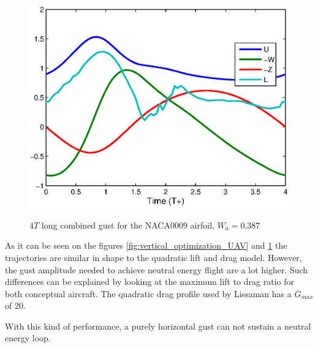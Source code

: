 \begin{figure}[h]
  \begin{center}
    \scalebox{1.0}
    {\includegraphics{./Figures/Windtype=3_Tg=4_Wg=0p387_UAV_alphamax=12.eps}}
  \end{center}
  \caption{$4T$ long combined gust for the NACA0009 airfoil, $W_a=0.387$}
  \label{fig:combined_optimization_UAV}
\end{figure}

\FloatBarrier

As it can be seen on the figures \ref{fig:vertical_optimization_UAV} and \ref{fig:combined_optimization_UAV} the trajectories are similar in shape to the quadratic lift and drag model.
However, the gust amplitude needed to achieve neutral energy flight are a lot higher.
Such differences can be explained by looking at the maximum lift to drag ratio for both conceptual aircraft.
The quadratic drag profile used by Lissaman has a $G_{max}$ of 20.

\FloatBarrier

\par With this kind of performance, a purely horizontal gust can not sustain a neutral energy loop.

\FloatBarrier

%

